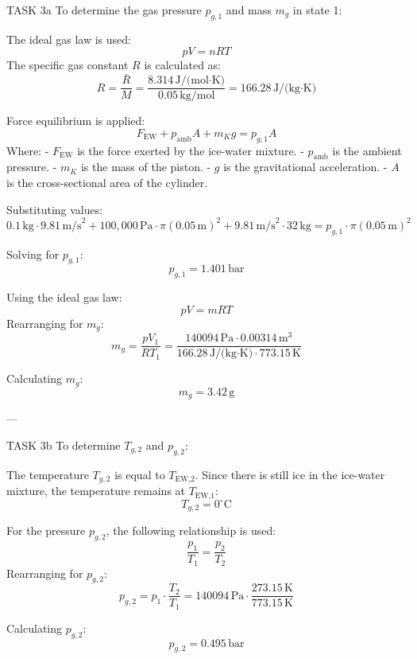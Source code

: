 TASK 3a  
To determine the gas pressure \( p_{g,1} \) and mass \( m_g \) in state 1:  

The ideal gas law is used:  
\[
pV = nRT
\]  
The specific gas constant \( R \) is calculated as:  
\[
R = \frac{\bar{R}}{M} = \frac{8.314 \, \text{J/(mol·K)}}{0.05 \, \text{kg/mol}} = 166.28 \, \text{J/(kg·K)}
\]  

Force equilibrium is applied:  
\[
F_{\text{EW}} + p_{\text{amb}} A + m_K g = p_{g,1} A
\]  
Where:  
- \( F_{\text{EW}} \) is the force exerted by the ice-water mixture.  
- \( p_{\text{amb}} \) is the ambient pressure.  
- \( m_K \) is the mass of the piston.  
- \( g \) is the gravitational acceleration.  
- \( A \) is the cross-sectional area of the cylinder.  

Substituting values:  
\[
0.1 \, \text{kg} \cdot 9.81 \, \text{m/s}^2 + 100,000 \, \text{Pa} \cdot \pi (0.05 \, \text{m})^2 + 9.81 \, \text{m/s}^2 \cdot 32 \, \text{kg} = p_{g,1} \cdot \pi (0.05 \, \text{m})^2
\]  

Solving for \( p_{g,1} \):  
\[
p_{g,1} = 1.401 \, \text{bar}
\]  

Using the ideal gas law:  
\[
pV = mRT
\]  
Rearranging for \( m_g \):  
\[
m_g = \frac{p V_1}{R T_1} = \frac{140094 \, \text{Pa} \cdot 0.00314 \, \text{m}^3}{166.28 \, \text{J/(kg·K)} \cdot 773.15 \, \text{K}}
\]  

Calculating \( m_g \):  
\[
m_g = 3.42 \, \text{g}
\]  

---

TASK 3b  
To determine \( T_{g,2} \) and \( p_{g,2} \):  

The temperature \( T_{g,2} \) is equal to \( T_{\text{EW,2}} \). Since there is still ice in the ice-water mixture, the temperature remains at \( T_{\text{EW,1}} \):  
\[
T_{g,2} = 0^\circ\text{C}
\]  

For the pressure \( p_{g,2} \), the following relationship is used:  
\[
\frac{p_1}{T_1} = \frac{p_2}{T_2}
\]  
Rearranging for \( p_{g,2} \):  
\[
p_{g,2} = p_1 \cdot \frac{T_2}{T_1} = 140094 \, \text{Pa} \cdot \frac{273.15 \, \text{K}}{773.15 \, \text{K}}
\]  

Calculating \( p_{g,2} \):  
\[
p_{g,2} = 0.495 \, \text{bar}
\]